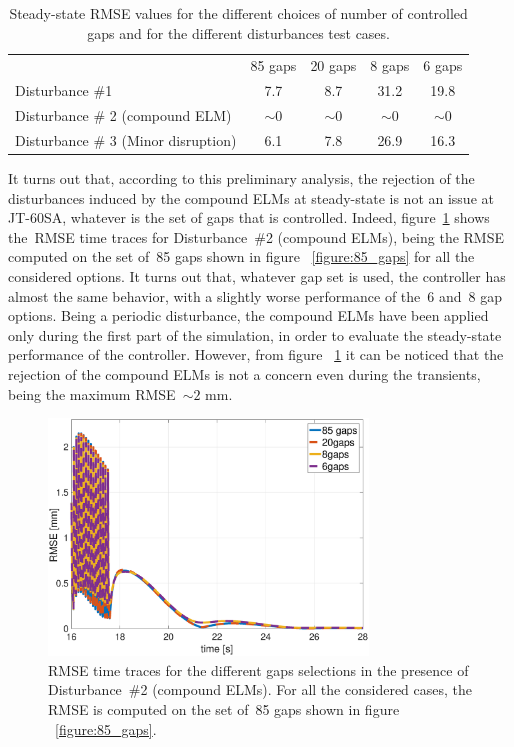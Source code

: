 \begin{table}[h]
	\centering
	\begin{tabular}{|l|c|c|c|c|}
		\hline
		\rowcolor{color2}
		\multicolumn{5}{|c|}{\textbf{Steady-state RMSE  mm}}                        \\ \hline
		\rowcolor{color1}
		\multicolumn{1}{|c|}{}              & 85 gaps & 20 gaps & 8 gaps  & 6 gaps  \\ \hline
		Disturbance \#1                     & 7.7     & 8.7     & 31.2    & 19.8    \\ \hline
		Disturbance \# 2 (compound ELM)      & $\sim 0$ & $\sim 0$ & $\sim 0$ & $\sim 0$ \\ \hline
		Disturbance \# 3 (Minor disruption) & 6.1     & 7.8     & 26.9    & 16.3    \\ \hline
	\end{tabular}
	\caption{Steady-state RMSE values for the different choices of number of controlled gaps and for the different disturbances test cases. }
	\label{gapTable}
\end{table}


It turns out that, according to this preliminary analysis, the rejection of the disturbances induced by the compound ELMs at steady-state is not an issue at JT-60SA, whatever is the set of gaps that is controlled. Indeed, figure~\ref{figure:RMSE_ELM} shows the~RMSE time traces for Disturbance~\#2 (compound ELMs), being the RMSE computed on the set of~85 gaps shown in figure ~\ref{figure:85_gaps} for all the considered options. It turns out that, whatever gap set is used, the controller has almost the same behavior, with a slightly worse performance of the~6 and~8 gap options. Being a periodic disturbance, the compound ELMs have been applied only during the first part of the simulation, in order to evaluate the steady-state performance of the controller. However, from figure ~\ref{figure:RMSE_ELM} it can be noticed that the rejection of the compound ELMs is not a concern even during the transients, being the maximum RMSE~$\sim 2$ mm. \smallskip

\begin{figure}[!thb]
	\begin{center}
		\includegraphics[width=8.5cm]{Chp3/RMSE_ELM.eps}
	\end{center}\caption{RMSE time traces for the different gaps selections in the presence of Disturbance~\#2 (compound ELMs). For all the considered cases, the RMSE is computed on the set of~85 gaps shown in figure ~\ref{figure:85_gaps}.}\label{figure:RMSE_ELM}
\end{figure}





